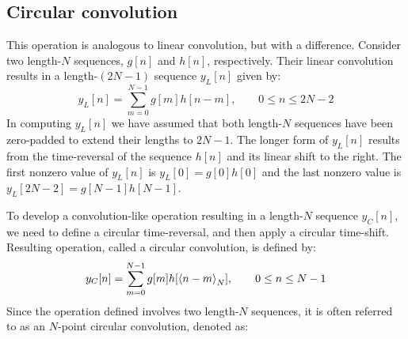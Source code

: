 \documentclass[../../main/main.tex]{subfiles}
\begin{document}
\subsection{Circular convolution}
This operation is analogous to linear convolution, but with a difference. Consider two length-\( N \) sequences, \( g[n] \) and \( h[n] \), respectively. Their linear convolution results in a length-\( (2N-1) \) sequence \( y_{L}[n] \) given by:
\begin{equation}
    y_{L}[n]
    =
    \sum_{m=0}^{N-1} g[m]h[n-m],
    \qquad
    0 \le n \le 2N-2
    \label{eq:L12_S40_1}
\end{equation}
In computing \( y_{L}[n] \) we have assumed that both length-\( N \) sequences have been zero-padded to extend their lengths to \( 2N - 1 \).
The longer form of \( y_{L}[n] \) results from the time-reversal of the sequence \( h[n] \) and its linear shift to the right.
The first nonzero value of \( y_{L}[n] \) is \( y_{L}[0] = g[0]h[0] \) and the last nonzero value is \( y_{L}[2N-2] = g[N-1]h[N-1] \).

To develop a convolution-like operation resulting in a length-\( N \) sequence \( y_{C}[n] \), we need to define a circular time-reversal, and then apply a circular time-shift.
Resulting operation, called a circular convolution, is defined by:
\begin{equation}
    y_{C}[n]
    =
    \sum_{m=0}^{N-1} g[m]h[\expval{n-m}_{N}],
    \qquad
    0 \le n \le N-1
    \label{eq:L12_S42_1}
\end{equation}
Since the operation defined involves two length-\( N \) sequences, it is often referred to as an \( N \)-point circular convolution, denoted as:

\end{document}
